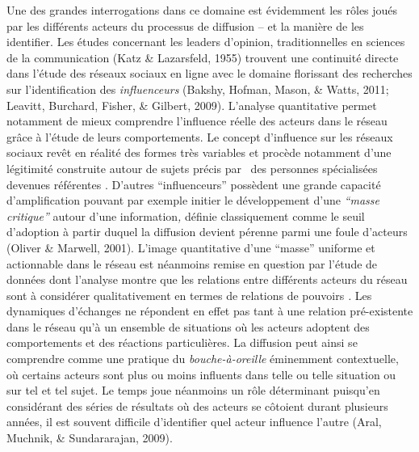 Une des grandes interrogations dans ce domaine est \'evidemment les
r\^oles jou\'es par les diff\'erents acteurs du processus de diffusion
-- et la mani\`ere de les identifier. Les \'etudes concernant les
leaders d{\textquoteright}opinion, traditionnelles en sciences de la
communication (Katz \& Lazarsfeld, 1955) trouvent une continuit\'e
directe dans l{\textquoteright}\'etude des r\'eseaux sociaux en ligne
avec le domaine florissant des recherches sur
l{\textquoteright}identification des \textit{influenceurs} (Bakshy,
Hofman, Mason, \& Watts, 2011; Leavitt, Burchard, Fisher, \& Gilbert,
2009). L{\textquoteright}analyse quantitative permet notamment de mieux
comprendre l{\textquoteright}influence r\'eelle des acteurs dans le
r\'eseau gr\^ace \`a l{\textquoteright}\'etude de leurs comportements.
Le concept d{\textquoteright}influence sur les r\'eseaux sociaux
rev\^et en r\'ealit\'e des formes tr\`es variables et proc\`ede
notamment d{\textquoteright}une l\'egitimit\'e construite autour de
sujets pr\'ecis par \ des personnes sp\'ecialis\'ees devenues
r\'ef\'erentes \cite{Cha et al.2010}. D{\textquoteright}autres
{\textquotedblleft}influenceurs{\textquotedblright} poss\`edent une
grande capacit\'e d{\textquoteright}amplification pouvant par exemple
initier le d\'eveloppement d{\textquoteright}une
\textit{{\textquotedblleft}masse critique{\textquotedblright} }autour
d{\textquoteright}une information\textit{, }d\'efinie classiquement
comme le seuil d{\textquoteright}adoption \`a partir duquel la
diffusion devient p\'erenne parmi une foule d{\textquoteright}acteurs
(Oliver \& Marwell, 2001). L{\textquoteright}image quantitative
d{\textquoteright}une {\textquotedblleft}masse{\textquotedblright}
uniforme et actionnable dans le r\'eseau est n\'eanmoins remise en
question par l{\textquoteright}\'etude de donn\'ees dont
l{\textquoteright}analyse montre que les relations entre diff\'erents
acteurs du r\'eseau sont \`a consid\'erer qualitativement en termes de
relations de pouvoirs \cite{Steyer et al.2006}\textit{. }Les dynamiques
d{\textquoteright}\'echanges ne r\'epondent en effet pas tant \`a une
relation pr\'e-existente dans le r\'eseau qu{\textquoteright}\`a un
ensemble de situations o\`u les acteurs adoptent des comportements et
des r\'eactions particuli\`eres. La diffusion peut ainsi se comprendre
comme une pratique du \textit{bouche-\`a-oreille} \'eminemment
contextuelle, o\`u certains acteurs sont plus ou moins influents dans
telle ou telle situation ou sur tel et tel sujet. Le temps joue
n\'eanmoins un r\^ole d\'eterminant puisqu{\textquoteright}en
consid\'erant des s\'eries de r\'esultats o\`u des acteurs se
c\^otoient durant plusieurs ann\'ees, il est souvent difficile
d{\textquoteright}identifier quel acteur influence
l{\textquoteright}autre (Aral, Muchnik, \& Sundararajan, 2009). 

